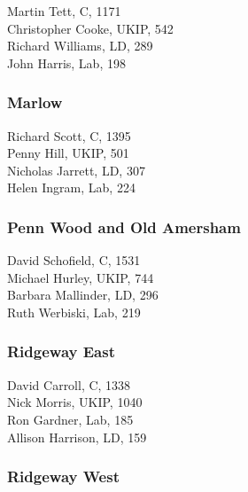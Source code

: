 \documentclass[a4paper,openany,10pt]{book}
\begin{document}
Martin Tett, C, 1171\\
Christopher Cooke, UKIP, 542\\
Richard Williams, LD, 289\\
John Harris, Lab, 198\\


\subsubsection*{Marlow}



Richard Scott, C, 1395\\
Penny Hill, UKIP, 501\\
Nicholas Jarrett, LD, 307\\
Helen Ingram, Lab, 224\\


\subsubsection*{Penn Wood and Old Amersham}



David Schofield, C, 1531\\
Michael Hurley, UKIP, 744\\
Barbara Mallinder, LD, 296\\
Ruth Werbiski, Lab, 219\\


\subsubsection*{Ridgeway East}



David Carroll, C, 1338\\
Nick Morris, UKIP, 1040\\
Ron Gardner, Lab, 185\\
Allison Harrison, LD, 159\\


\subsubsection*{Ridgeway West}

\end{document}
